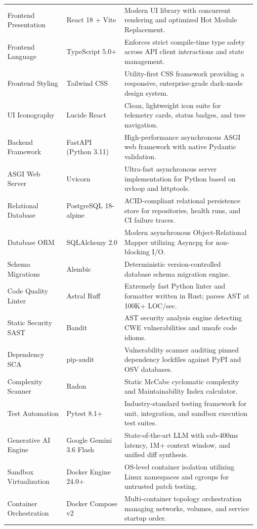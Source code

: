 \begin{longtable}{p{} p{} p{}}
Frontend Presentation & React 18 + Vite & Modern UI library with concurrent rendering and optimized Hot Module Replacement. \\
\addlinespace
Frontend Language & TypeScript 5.0+ & Enforces strict compile-time type safety across API client interactions and state management. \\
\addlinespace
Frontend Styling & Tailwind CSS & Utility-first CSS framework providing a responsive, enterprise-grade dark-mode design system. \\
\addlinespace
UI Iconography & Lucide React & Clean, lightweight icon suite for telemetry cards, status badges, and tree navigation. \\
\addlinespace
Backend Framework & FastAPI (Python 3.11) & High-performance asynchronous ASGI web framework with native Pydantic validation. \\
\addlinespace
ASGI Web Server & Uvicorn & Ultra-fast asynchronous server implementation for Python based on uvloop and httptools. \\
\addlinespace
Relational Database & PostgreSQL 18-alpine & ACID-compliant relational persistence store for repositories, health runs, and CI failure traces. \\
\addlinespace
Database ORM & SQLAlchemy 2.0 & Modern asynchronous Object-Relational Mapper utilizing Asyncpg for non-blocking I/O. \\
\addlinespace
Schema Migrations & Alembic & Deterministic version-controlled database schema migration engine. \\
\addlinespace
Code Quality Linter & Astral Ruff & Extremely fast Python linter and formatter written in Rust; parses AST at 100K+ LOC/sec. \\
\addlinespace
Static Security SAST & Bandit & AST security analysis engine detecting CWE vulnerabilities and unsafe code idioms. \\
\addlinespace
Dependency SCA & pip-audit & Vulnerability scanner auditing pinned dependency lockfiles against PyPI and OSV databases. \\
\addlinespace
Complexity Scanner & Radon & Static McCabe cyclomatic complexity and Maintainability Index calculator. \\
\addlinespace
Test Automation & Pytest 8.1+ & Industry-standard testing framework for unit, integration, and sandbox execution test suites. \\
\addlinespace
Generative AI Engine & Google Gemini 3.6 Flash & State-of-the-art LLM with sub-400ms latency, 1M+ context window, and unified diff synthesis. \\
\addlinespace
Sandbox Virtualization & Docker Engine 24.0+ & OS-level container isolation utilizing Linux namespaces and cgroups for untrusted patch testing. \\
\addlinespace
Container Orchestration & Docker Compose v2 & Multi-container topology orchestration managing networks, volumes, and service startup order. \\
\end{longtable}

